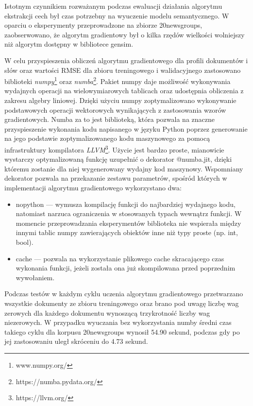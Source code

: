 \documentclass{pracamgr}
\begin{document}
Istotnym czynnikiem rozważanym podczas ewaluacji działania algorytmu ekstrakcji cech był czas potrzebny na wyuczenie modelu semantycznego. W oparciu o eksperymenty przeprowadzone na zbiorze 20newsgroups, zaobserwowano, że algorytm gradientowy był o kilka rzędów wielkości wolniejszy niż algorytm dostępny w bibliotece gensim.

W celu przyspieszenia obliczeń algorytmu gradientowego dla profili dokumentów i słów oraz wartości RMSE dla zbioru treningowego i walidacyjnego zastosowano biblioteki \textit{numpy}\footnote{www.numpy.org/} oraz \textit{numba}\footnote{https://numba.pydata.org/}. Pakiet numpy daje możliwość wykonywania wydajnych operacji na wielowymiarowych tablicach oraz udostępnia obliczenia z zakresu algebry liniowej. Dzięki użyciu numpy zoptymalizowano wykonywanie podstawowych operacji wektorowych wynikających z zastosowania wzorów gradientowych. Numba za to jest biblioteką, która pozwala na znaczne przyspieszenie wykonania kodu napisanego w języku Python poprzez generowanie na jego podstawie zoptymalizowanego kodu maszynowego za pomocą infrastruktury kompilatora \textit{LLVM}\footnote{https://llvm.org/}. Użycie jest bardzo proste, mianowicie wystarczy optymalizowaną funkcję uzupełnić o dekorator @numba.jit, dzięki któremu zostanie dla niej wygenerowany wydajny kod maszynowy. Wspomniany dekorator pozwala na przekazanie zestawu parametrów, spośród których w implementacji algorytmu gradientowego wykorzystano dwa:

\begin{itemize}
    \item nopython --- wymusza kompilację funkcji do najbardziej wydajnego kodu, natomiast narzuca ograniczenia w stosowanych typach wewnątrz funkcji. W momencie przeprowadzania eksperymentów biblioteka nie wspierała między innymi tablic numpy zawierających obiektów inne niż typy proste (np. int, bool).
    \item cache --- pozwala na wykorzystanie plikowego cache skracającego czas wykonania funkcji, jeżeli została ona już skompilowana przed poprzednim wywołaniem.
\end{itemize}

Podczas testów w każdym cyklu uczenia algorytmu gradientowego przetwarzano wszystkie dokumenty ze zbioru treningowego oraz brano pod uwagę liczbę wag zerowych dla każdego dokumentu wynoszącą trzykrotność liczby wag niezerowych. W przypadku wyuczania bez wykorzystania numby średni czas takiego cyklu dla korpusu 20newsgroups wynosił 54.90 sekund, podczas gdy po jej zastosowaniu uległ skróceniu do 4.73 sekund.
\end{document}
